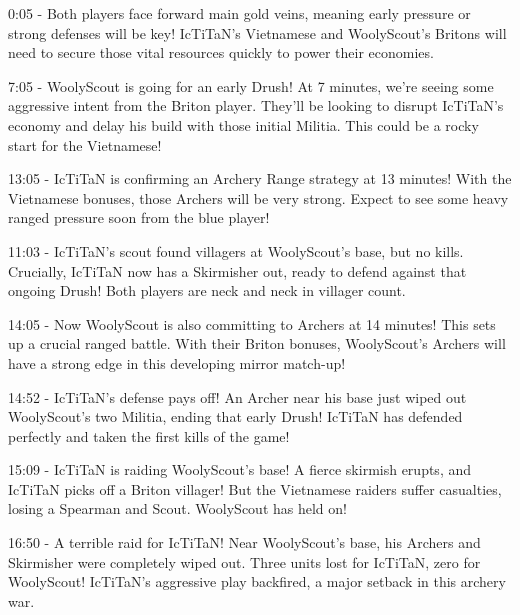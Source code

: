 0:05 - Both players face forward main gold veins, meaning early pressure or strong defenses will be key! IcTiTaN's Vietnamese and WoolyScout's Britons will need to secure those vital resources quickly to power their economies. \par \vspace{1em}

7:05 - WoolyScout is going for an early Drush! At 7 minutes, we're seeing some aggressive intent from the Briton player. They'll be looking to disrupt IcTiTaN's economy and delay his build with those initial Militia. This could be a rocky start for the Vietnamese! \par \vspace{1em}

13:05 - IcTiTaN is confirming an Archery Range strategy at 13 minutes! With the Vietnamese bonuses, those Archers will be very strong. Expect to see some heavy ranged pressure soon from the blue player! \par \vspace{1em}

11:03 - IcTiTaN's scout found villagers at WoolyScout's base, but no kills. Crucially, IcTiTaN now has a Skirmisher out, ready to defend against that ongoing Drush! Both players are neck and neck in villager count. \par \vspace{1em}

14:05 - Now WoolyScout is also committing to Archers at 14 minutes! This sets up a crucial ranged battle. With their Briton bonuses, WoolyScout's Archers will have a strong edge in this developing mirror match-up! \par \vspace{1em}

14:52 - IcTiTaN's defense pays off! An Archer near his base just wiped out WoolyScout's two Militia, ending that early Drush! IcTiTaN has defended perfectly and taken the first kills of the game! \par \vspace{1em}

15:09 - IcTiTaN is raiding WoolyScout's base! A fierce skirmish erupts, and IcTiTaN picks off a Briton villager! But the Vietnamese raiders suffer casualties, losing a Spearman and Scout. WoolyScout has held on! \par \vspace{1em}

16:50 - A terrible raid for IcTiTaN! Near WoolyScout's base, his Archers and Skirmisher were completely wiped out. Three units lost for IcTiTaN, zero for WoolyScout! IcTiTaN's aggressive play backfired, a major setback in this archery war. \par \vspace{1em}

